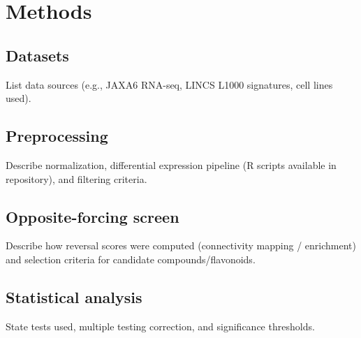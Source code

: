 \section*{Methods}

\subsection*{Datasets}
List data sources (e.g., JAXA6 RNA-seq, LINCS L1000 signatures, cell lines used).

\subsection*{Preprocessing}
Describe normalization, differential expression pipeline (R scripts available in repository), and filtering criteria.

\subsection*{Opposite-forcing screen}
Describe how reversal scores were computed (connectivity mapping / enrichment) and selection criteria for candidate compounds/flavonoids.

\subsection*{Statistical analysis}
State tests used, multiple testing correction, and significance thresholds.
